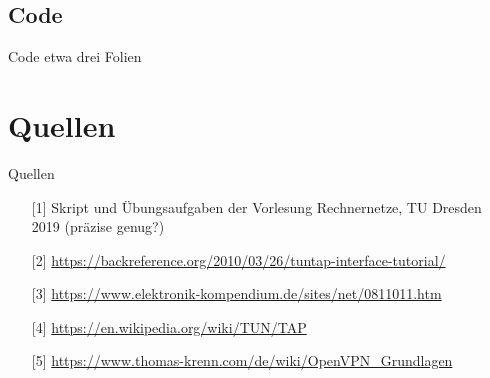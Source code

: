 \documentclass[ngerman,aspectratio=169]{beamer}
\begin{document}
	\subsection{Code}
	\begin{frame}{Code}
		etwa drei Folien
	\end{frame}

	\section{Quellen}
	\begin{frame}{Quellen}
		\begin{enumerate}
			\item[{[1]}] Skript und Übungsaufgaben der Vorlesung Rechnernetze, TU Dresden 2019 (präzise genug?) \label{src:rene}
			\item[{[2]}] \url{https://backreference.org/2010/03/26/tuntap-interface-tutorial/}
			\item[{[3]}] \url{https://www.elektronik-kompendium.de/sites/net/0811011.htm}
			\item[{[4]}] \url{https://en.wikipedia.org/wiki/TUN/TAP}
			\item[{[5]}] \url{https://www.thomas-krenn.com/de/wiki/OpenVPN_Grundlagen}
		\end{enumerate}
\end{frame}
\end{document}
